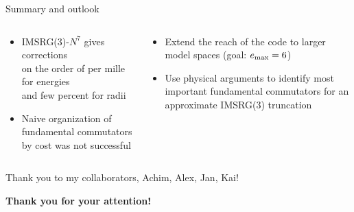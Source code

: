 \documentclass[aspectratio=169]{beamer}
\newcommand{\backupbegin}{
   \newcounter{finalframe}
   \setcounter{finalframe}{\value{framenumber}}
}
\begin{document}
\begin{frame}{Summary and outlook}
  \begin{columns}
    \begin{column}{0.5\textwidth}
      \begin{itemize}
        \item IMSRG(3)-$N^7$ gives corrections \\
              on the order of per mille for energies \\
              and few percent for radii
        \item Naive organization of fundamental commutators by cost was not successful
      \end{itemize}
    \end{column}
    \begin{column}{0.5\textwidth}
      \pause
      \begin{itemize}
        \item Extend the reach of the code to larger model spaces (goal: $e_{\text{max}}=6$)
        \item Use physical arguments to identify most important fundamental commutators
              for an approximate IMSRG(3) truncation
      \end{itemize}
    \end{column}
  \end{columns}
  \pause
  \begin{center}
    Thank you to my collaborators, Achim, Alex, Jan, Kai!
  \end{center}
  \pause
  \begin{center}
    \textbf{Thank you for your attention!}
  \end{center}
\end{frame}

\appendix
\backupbegin
\end{document}
